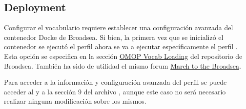 \subsection{Deployment}

Configurar el vocabulario requiere establecer una configuración avanzada del contenedor Docke de Broadsea. Si bien, la primera vez que se inicializó el contenedor se ejecutó el perfil  ahora se va a ejecutar específicamente el perfil . Esta opción se especifica en la sección \href{https://github.com/OHDSI/Broadsea?tab=readme-ov-file#omop-vocab-loading}{OMOP Vocab Loading} del repositorio de Broadsea. También ha sido de utilidad el mismo forum \href{https://forums.ohdsi.org/t/march-to-the-broadsea/20576}{March to the Broadsea}.

Para acceder a la información y configuración avanzada del perfil se puede acceder al  y a la sección 9 del archivo , aunque este caso no será necesario realizar ninguna modificación sobre los mismos.


